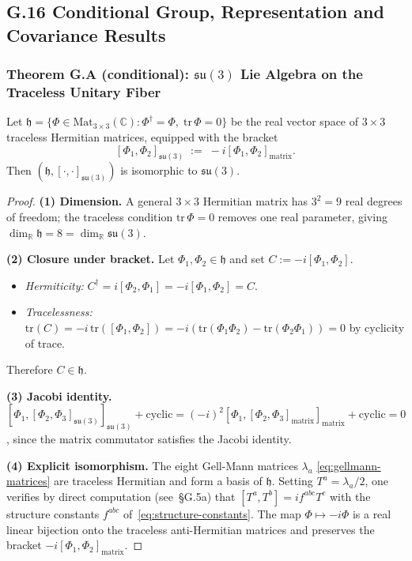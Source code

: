 \subsection*{G.16 Conditional Group, Representation and Covariance Results}
\label{sec:G16_formal_proofs}

\subsubsection*{Theorem G.A (conditional): $\mathfrak{su}(3)$ Lie Algebra on the Traceless Unitary Fiber}

\begin{tcolorbox}[colback=blue!3!white,colframe=blue!40!black,title=Theorem G.A (conditional on the unitary-carrier postulate)]
Let $\mathfrak{h} = \{\Phi\in\mathrm{Mat}_{3\times3}(\mathbb{C}) : \Phi^\dagger=\Phi,\;\mathrm{tr}\,\Phi=0\}$
be the real vector space of $3\times3$ traceless Hermitian matrices, equipped with the bracket
\[[\Phi_1,\Phi_2]_{\mathfrak{su}(3)} \;:=\; -i[\Phi_1,\Phi_2]_{\mathrm{matrix}}.\]
Then $(\mathfrak{h},[\cdot,\cdot]_{\mathfrak{su}(3)})$ is isomorphic to $\mathfrak{su}(3)$.
\end{tcolorbox}

\begin{proof}
\textbf{(1) Dimension.}
A general $3\times3$ Hermitian matrix has $3^2=9$ real degrees of freedom;
the traceless condition $\mathrm{tr}\,\Phi=0$ removes one real parameter, giving
$\dim_\mathbb{R}\mathfrak{h}=8=\dim_\mathbb{R}\mathfrak{su}(3)$.

\medskip
\textbf{(2) Closure under bracket.}
Let $\Phi_1,\Phi_2\in\mathfrak{h}$ and set $C := -i[\Phi_1,\Phi_2]$.
\begin{itemize}
  \item \emph{Hermiticity:}
    $C^\dagger=i[\Phi_2,\Phi_1]=-i[\Phi_1,\Phi_2]=C$.
  \item \emph{Tracelessness:}
    $\mathrm{tr}(C) = -i\,\mathrm{tr}([\Phi_1,\Phi_2]) = -i(\mathrm{tr}(\Phi_1\Phi_2)-\mathrm{tr}(\Phi_2\Phi_1))=0$
    by cyclicity of trace.
\end{itemize}
Therefore $C\in\mathfrak{h}$.

\medskip
\textbf{(3) Jacobi identity.}
$[\Phi_1,[\Phi_2,\Phi_3]_{\mathfrak{su}(3)}]_{\mathfrak{su}(3)} + \mathrm{cyclic}
= (-i)^2[\Phi_1,[\Phi_2,\Phi_3]_{\mathrm{matrix}}]_{\mathrm{matrix}}+\mathrm{cyclic}=0$,
since the matrix commutator satisfies the Jacobi identity.

\medskip
\textbf{(4) Explicit isomorphism.}
The eight Gell-Mann matrices $\lambda_a$ \eqref{eq:gellmann-matrices} are traceless Hermitian
and form a basis of $\mathfrak{h}$.  Setting $T^a=\lambda_a/2$, one verifies by direct computation
(see~\S G.5a) that $[T^a,T^b]=if^{abc}T^c$ with the structure constants $f^{abc}$
of~\eqref{eq:structure-constants}. The map $\Phi\mapsto-i\Phi$ is a real
linear bijection onto the traceless anti-Hermitian matrices and preserves
the bracket $-i[\Phi_1,\Phi_2]_{\mathrm{matrix}}$.
\end{proof}

